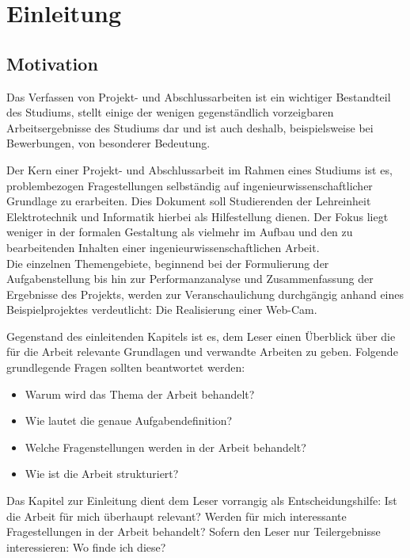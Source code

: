 
\chapter{Einleitung}
\label{sec:Einleitung}

\section{Motivation}
\label{sec:Motivation}

Das Verfassen von Projekt- und Abschlussarbeiten ist ein wichtiger Bestandteil des Studiums, stellt einige der wenigen gegenständlich vorzeigbaren Arbeitsergebnisse des Studiums dar und ist auch deshalb, beispielsweise bei Bewerbungen, von besonderer Bedeutung. 

Der Kern einer Projekt- und Abschlussarbeit im Rahmen eines Studiums ist es, problembezogen Fragestellungen selbständig auf ingenieurwissenschaftlicher Grundlage zu erarbeiten. Dies Dokument soll Studierenden der Lehreinheit Elektrotechnik und Informatik hierbei als Hilfestellung dienen. Der Fokus liegt weniger in der formalen Gestaltung als vielmehr im Aufbau und den zu bearbeitenden Inhalten einer ingenieurwissenschaftlichen Arbeit.\\

Die einzelnen Themengebiete, beginnend bei der Formulierung der Aufgabenstellung bis hin zur Performanzanalyse und Zusammenfassung der Ergebnisse des Projekts, werden zur Veranschaulichung durchgängig anhand eines Beispielprojektes verdeutlicht: Die Realisierung einer Web-Cam.

Gegenstand des einleitenden Kapitels ist es, dem Leser einen Überblick über die für die Arbeit relevante Grundlagen und verwandte Arbeiten zu geben. Folgende grundlegende Fragen sollten beantwortet werden:
\begin{itemize}
	\item Warum wird das Thema der Arbeit behandelt? 
	\item Wie lautet die genaue Aufgabendefinition?
	\item Welche Fragenstellungen werden in der Arbeit behandelt?	
	\item Wie ist die Arbeit strukturiert?  
\end{itemize}

Das Kapitel zur Einleitung dient dem Leser vorrangig als Entscheidungshilfe: Ist die Arbeit für mich überhaupt relevant? Werden für mich interessante Fragestellungen in der Arbeit behandelt? Sofern den Leser nur Teilergebnisse interessieren: Wo finde ich diese?

